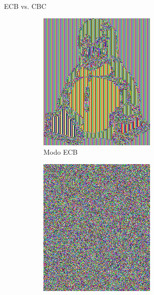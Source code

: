 \begin{frame}{ECB vs. CBC}
\begin{figure}[h!]
\begin{subfigure}[b]{0.3\textwidth}
      \includegraphics[width=\textwidth]{Tux-ecb.png}
      \caption{Modo ECB}
    \end{subfigure}
    \hfill
    \begin{subfigure}[b]{0.3\textwidth}
      \centering 
      \includegraphics[width=\textwidth]{Tux-cbc.png}

\end{subfigure}
\end{figure}
\end{frame}
